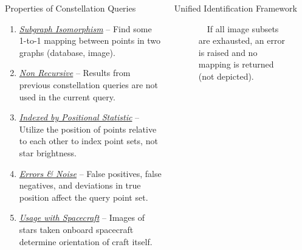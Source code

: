 \documentclass{beamer}
\newlength{\onecolwid}
\newlength{\twocolwid}
\begin{document}
\begin{frame}[t]
\begin{columns}[t]
\begin{column}{\onecolwid}
				\vspace*{0.5cm}
				\begin{block}{Properties of Constellation Queries}
					\begin{enumerate}
						\setlength\itemsep{1cm}
						\item \parbox{0.95\linewidth}{
							\underline{\emph{Subgraph Isomorphism}} -- Find some 1-to-1 mapping between points in two graphs (database, image).
							}
						\item \parbox{0.95\linewidth}{
							\underline{\emph{Non Recursive}} -- Results from previous constellation queries are not used in the current query.
							}
						\item \parbox{0.95\linewidth}{
							\underline{\emph{Indexed by Positional Statistic}} -- Utilize the position of points relative to each other to index point sets, not star brightness.
							}
						\item \parbox{0.95\linewidth}{
							\underline{\emph{Errors \& Noise}} -- False positives, false negatives, and deviations in true position affect the query point set.
							}
						\item \parbox{0.95\linewidth}{
							\underline{\emph{Usage with Spacecraft}} -- Images of stars taken onboard spacecraft determine orientation of craft itself.
							}
					\end{enumerate}
				\end{block}
			\end{column}
			
			\begin{column}{\twocolwid}
				\begin{columns}[t,totalwidth=\twocolwid]
					\begin{column}{\onecolwid}\vspace{-.6in} %
						\begin{block}{Unified Identification Framework}
							\begin{figure}
								\centering
								
								\parbox{0.95\linewidth}{\caption{\ \
									If all image subsets are exhausted, an error is raised and no mapping is returned (not depicted).
								}}
							\end{figure}
						\end{block}
					\end{column}
					

\end{columns}
\end{column}
\end{columns}
\end{frame}
\end{document}
